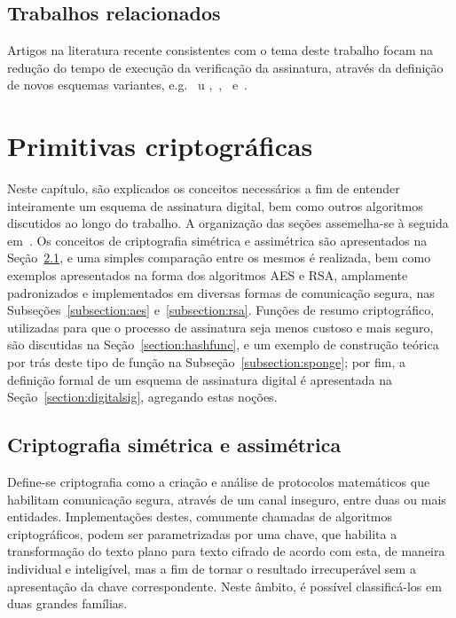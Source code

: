 \documentclass[12pt,notitlepage]{report}
\begin{document}
\section{Trabalhos relacionados}
\label{section:related}

Artigos na literatura recente consistentes com o tema deste trabalho focam
na redução do tempo de execução da verificação da assinatura, através da
definição de novos esquemas variantes,
e.g.~\cite{cruz2016constant} u ,~\cite{Steinwandt2008},~\cite{mcgrew-hash-sigs-11}
e~\cite{Pereira:2016:SHS:2929115.2929248}.

\chapter{Primitivas criptográficas}
\label{chapter:primitives}

Neste capítulo, são explicados os conceitos necessários
a fim de entender inteiramente um esquema de assinatura digital, bem como outros
algoritmos discutidos ao longo do trabalho. A organização das seções assemelha-se
à seguida em~\cite{Gathen:2015:CRY:2857293}. Os conceitos de criptografia simétrica
e assimétrica são apresentados na Seção~\ref{section:crypto}, e uma simples comparação entre os mesmos é realizada,
bem como exemplos apresentados na forma dos algoritmos AES e RSA, amplamente
padronizados e implementados em diversas formas de comunicação segura, nas Subseções~\ref{subsection:aes} e~\ref{subsection:rsa}. Funções de resumo criptográfico, utilizadas para que o processo de assinatura
seja menos custoso e mais seguro, são discutidas na Seção~\ref{section:hashfunc}, e um exemplo de construção teórica por trás deste tipo de função na Subseção~\ref{subsection:sponge}; por fim, a definição formal de um esquema de assinatura digital é apresentada na Seção~\ref{section:digitalsig}, agregando estas noções.

\section{Criptografia simétrica e assimétrica}
\label{section:crypto}

Define-se criptografia como a criação e análise de protocolos
matemáticos que habilitam comunicação segura, através de um canal
inseguro, entre duas ou mais entidades. Implementações destes,
comumente chamadas de algoritmos criptográficos,
podem ser parametrizadas por uma chave, que habilita a transformação
do texto plano para texto cifrado de acordo
com esta, de maneira individual e inteligível, mas a fim de tornar o
resultado irrecuperável sem a apresentação da chave correspondente.
Neste âmbito, é possível classificá-los em duas grandes famílias.
\end{document}
